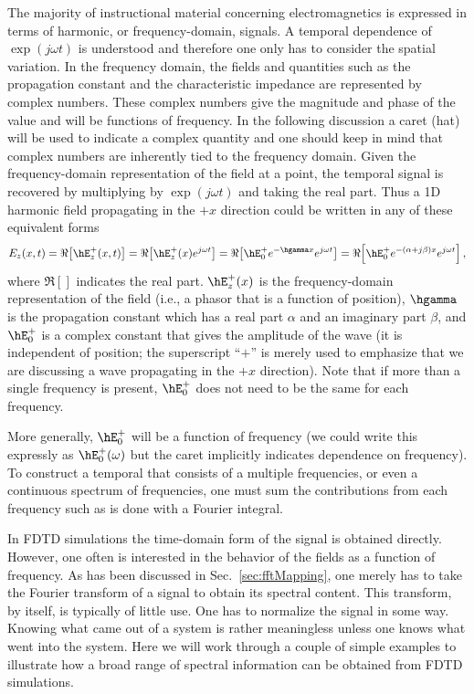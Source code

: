 The majority of instructional material concerning electromagnetics is
expressed in terms of harmonic, or frequency-domain, signals.  A
temporal dependence of $\exp(j\omega t)$ is understood and therefore
one only has to consider the spatial variation.  In the frequency
domain, the fields and quantities such as the propagation constant and
the characteristic impedance are represented by complex numbers.
These complex numbers give the magnitude and phase of the value and
will be functions of frequency.  In the following discussion a caret
(hat) will be used to indicate a complex quantity and one should keep
in mind that complex numbers are inherently tied to the frequency
domain.  Given the frequency-domain representation of the field at a
point, the temporal signal is recovered by multiplying by
$\exp(j\omega t)$ and taking the real part.  Thus a 1D harmonic field
propagating in the $+x$ direction could be written in any of these
equivalent forms
\begin{equation}
E_z(x,t) = 
  \Re\!\left[\hE_z^+(x,t)\right]
   = 
  \Re\!\left[\hE_z^+(x)e^{j\omega t}\right]
   = 
  \Re\!\left[\hE_0^+e^{-\hgamma x}e^{j\omega t}\right]
   = 
  \Re\!\left[\hE_0^+e^{-(\alpha+j\beta) x}e^{j\omega t}\right],
\end{equation}
where $\Re[]$ indicates the real part.  $\hE_z^+(x)$ is the
frequency-domain representation of the field (i.e., a phasor that is a
function of position), $\hgamma$ is the propagation constant which has
a real part $\alpha$ and an imaginary part $\beta$, and $\hE_0^+$ is a
complex constant that gives the amplitude of the wave (it is
independent of position; the superscript ``$+$'' is merely used to
emphasize that we are discussing a wave propagating in the $+x$
direction).  Note that if more than a single frequency is present,
$\hE_0^+$ does not need to be the same for each frequency.

More generally, $\hE_0^+$ will be a function of frequency (we could
write this expressly as $\hE_0^+(\omega)$ but the caret implicitly
indicates dependence on frequency).  To construct a temporal that
consists of a multiple frequencies, or even a continuous spectrum of
frequencies, one must sum the contributions from each frequency such
as is done with a Fourier integral.

In FDTD simulations the time-domain form of the signal is obtained
directly.  However, one often is interested in the behavior of the
fields as a function of frequency.  As has been discussed in Sec.\
\ref{sec:fftMapping}, one merely has to take the Fourier transform of
a signal to obtain its spectral content.  This transform, by itself,
is typically of little use.  One has to normalize the signal in some
way.  Knowing what came out of a system is rather meaningless unless
one knows what went into the system.  Here we will work through a
couple of simple examples to illustrate how a broad range of spectral
information can be obtained from FDTD simulations.


